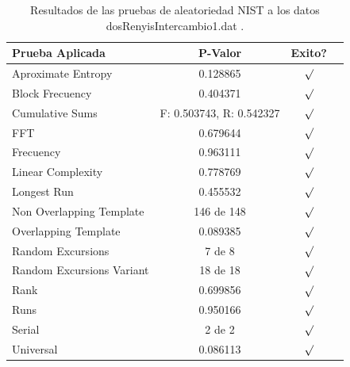 \documentclass[10pt]{IEEEtran}
\begin{document}
\begin{table}[H]
\caption{Resultados de las pruebas de aleatoriedad NIST a los datos dosRenyisIntercambio1.dat .}
\label{sample-table}
\vskip 0.15in
\begin{center}
\begin{small}
\begin{sc}
\begin{tabular}{lccr}
\hline

Prueba Aplicada &  P-Valor & Exito? \\
\hline

Aproximate Entropy    &  0.128865 & $\surd$ \\

Block Frecuency  &  0.404371 &  $\surd$  \\

Cumulative Sums    &   F: 0.503743, R: 0.542327  & $\surd$ \\

FFT    &   0.679644  &   $\surd$      \\

Frecuency     &  0.963111 &  $\surd$   \\

Linear Complexity      &  0.778769  & $\surd$ \\

Longest Run      & 0.455532 &    $\surd$      \\

Non Overlapping Template      &  146 de 148    &     $\surd$          \\

Overlapping Template      &  0.089385  &        $\surd$       \\

Random Excursions      &  7 de 8  &    $\surd$      \\

Random Excursions Variant &  18 de 18 &     $\surd$    \\

Rank &   0.699856  &      $\surd$      \\

Runs &   0.950166 &     $\surd$        \\

Serial &     2 de 2    &     $\surd$        \\

Universal &      0.086113  &   $\surd$            \\

\hline



\end{tabular}
\end{sc}
\end{small}
\end{center}
\vskip -0.1in
\end{table}
\end{document}
